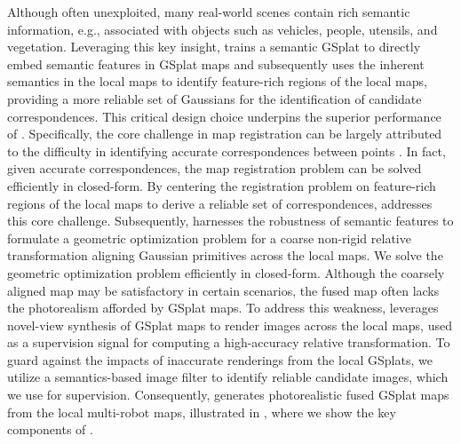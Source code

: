 Although often unexploited, many real-world scenes contain rich semantic information, e.g., associated with objects such as vehicles, people, utensils, and vegetation. Leveraging this key insight, \algname trains a semantic GSplat to directly embed semantic features in GSplat maps and subsequently uses the inherent semantics in the local maps to identify feature-rich regions of the local maps, providing a more reliable set of Gaussians for the identification of candidate correspondences. This critical design choice underpins the superior performance of \algname. Specifically, the core challenge in map registration can be largely attributed to the difficulty in identifying accurate correspondences between points \cite{tam2012registration}. In fact, given accurate correspondences, the map registration problem can be solved efficiently in closed-form. By centering the registration problem on feature-rich regions of the local maps to derive a reliable set of correspondences, \algname addresses this core challenge. Subsequently, \algname harnesses the robustness of semantic features to formulate a geometric optimization problem for a coarse non-rigid relative transformation aligning Gaussian primitives across the local maps. We solve the geometric optimization problem efficiently in closed-form. Although the coarsely aligned map may be satisfactory in certain scenarios, the fused map often lacks the photorealism afforded by GSplat  maps. To address this weakness, \algname leverages novel-view synthesis of GSplat maps to render images across the local maps, used as a supervision signal for computing a high-accuracy relative transformation. To guard against the impacts of inaccurate renderings from the local GSplats, we utilize a semantics-based image filter to identify reliable candidate images, which we use for supervision.
Consequently, \algname generates photorealistic fused GSplat maps from the local multi-robot maps, illustrated in , where we show the key components of \algname.

